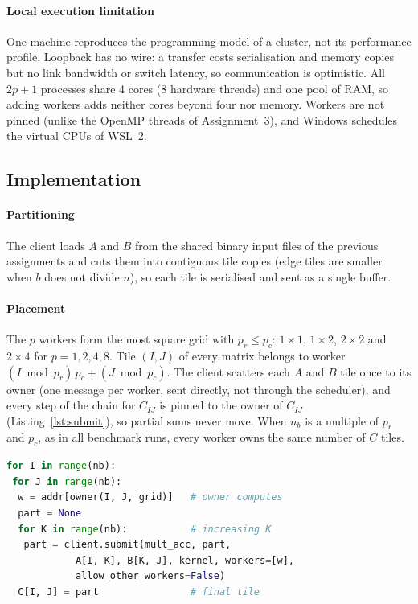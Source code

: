 \documentclass[conference,a4paper]{IEEEtran}
\begin{document}
\paragraph{Local execution limitation} One machine reproduces the programming
model of a cluster, not its performance profile. Loopback has no wire: a
transfer costs serialisation and memory copies but no link bandwidth or switch
latency, so communication is optimistic. All $2p + 1$ processes share 4 cores
(8 hardware threads) and one pool of RAM, so adding workers adds neither cores
beyond four nor memory. Workers are not pinned (unlike the OpenMP threads of
Assignment~3), and Windows schedules the virtual CPUs of WSL~2.

\subsection{Implementation}
\label{sec:impl}
\paragraph{Partitioning} The client loads $A$ and $B$ from the shared binary
input files of the previous assignments and cuts them into contiguous tile
copies (edge tiles are smaller when $b$ does not divide $n$), so each tile is
serialised and sent as a single buffer.

\paragraph{Placement} The $p$ workers form the most square grid with
$p_r \le p_c$: $1 \times 1$, $1 \times 2$, $2 \times 2$ and $2 \times 4$ for
$p = 1, 2, 4, 8$. Tile $(I, J)$ of every matrix belongs to worker
$(I \bmod p_r)\, p_c + (J \bmod p_c)$. The client scatters each $A$ and $B$ tile
once to its owner (one message per worker, sent directly, not through the
scheduler), and every step of the chain for $C_{IJ}$ is pinned to the owner of
$C_{IJ}$ (Listing~\ref{lst:submit}), so partial sums never move. When $n_b$ is a
multiple of $p_r$ and $p_c$, as in all benchmark runs, every worker owns the
same number of $C$ tiles.

\begin{lstlisting}[language=Python, float=t, caption={Task submission (simplified): each step receives the previous partial sum and two input tiles; Dask fetches tiles held elsewhere.}, label=lst:submit, captionpos=b]
for I in range(nb):
 for J in range(nb):
  w = addr[owner(I, J, grid)]   # owner computes
  part = None
  for K in range(nb):           # increasing K
   part = client.submit(mult_acc, part,
            A[I, K], B[K, J], kernel, workers=[w],
            allow_other_workers=False)
  C[I, J] = part                # final tile
\end{lstlisting}
\end{document}
